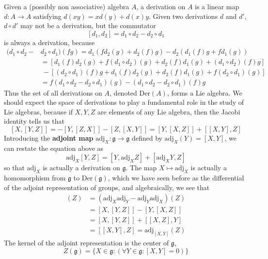 \begin{example}
    Given a (possibly non associative) algebra $A$, a derivation on $A$ is a linear map $d: A \to A$ satisfying $d(xy) = xd(y) + d(x)y$. Given two derivations $d$ and $d'$, $d \circ d'$ may not be a derivation, but the commutator
    \[ [d_1, d_2] = d_1 \circ d_2 - d_2 \circ d_1 \]
    is always a derivation, because
    \begin{align*}
        (d_1 \circ d_2 - &d_2 \circ d_1)(fg) = d_1(f d_2(g) + d_2(f) g) - d_2(d_1(f) g + f d_1(g))\\
        &= [d_1(f) d_2(g) + f (d_1 \circ d_2)(g) + d_2(f) d_1(g) + (d_1 \circ d_2)(f) g]\\
        &\ - [(d_2 \circ d_1)(f) g + d_1(f) d_2(g) + d_2(f) d_1(g) + f (d_2 \circ d_1)(g)]\\
        &= f(d_1 \circ d_2 - d_2 \circ d_1)(g) - (d_1 \circ d_2 - d_2 \circ d_1)(f) g
    \end{align*}
    Thus the set of all derivations on $A$, denoted $\text{Der}(A)$, forms a Lie algebra. We should expect the space of derivations to play a fundamental role in the study of Lie algebras, because if $X,Y,Z$ are elements of any Lie algebra, then the Jacobi identity tells us that
    \[ [X,[Y,Z]] = - [Y,[Z,X]] - [Z,[X,Y]] = [Y,[X,Z]] + [[X,Y],Z] \]
    Introducing the {\bf adjoint map} $\text{adj}_X: \mathfrak{g} \to \mathfrak{g}$ defined by $\text{adj}_X(Y) = [X,Y]$, we can restate the equation above as
    \[ \text{adj}_X[Y,Z] = [Y, \text{adj}_X Z] + [\text{adj}_XY, Z] \]
    so that $\text{adj}_X$ is actually a derivation on $\mathfrak{g}$. The map $X \mapsto \text{adj}_X$ is actually a homomorphism from $\mathfrak{g}$ to $\text{Der}(\mathfrak{g})$, which we have seen before as the differential of the adjoint representation of groups, and algebraically, we see that
    \begin{align*}
        [\text{adj}_X, \text{adj}_Y](Z) &= (\text{adj}_X \text{adj}_Y - \text{adj}_Y \text{adj}_X)(Z)\\
        &= [X,[Y,Z]] - [Y,[X,Z]]\\
        &= [X,[Y,Z]] + [[X,Z],Y]\\
        &= [[X,Y],Z] = \text{adj}_{[X,Y]}(Z)
    \end{align*}
    The kernel of the adjoint representation is the center of $\mathfrak{g}$,
    \[ Z(\mathfrak{g}) = \{ X \in \mathfrak{g} : (\forall Y \in \mathfrak{g}: [X,Y] = 0) \} \]

\end{example}
